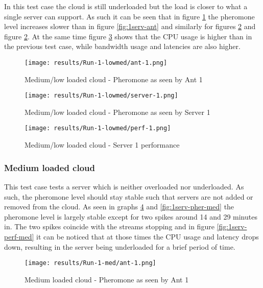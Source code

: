 In this test case the cloud is still underloaded but the load is closer to what a single server can support. As such it can be seen that in figure \ref{fig:1serv-ant-lowmed} the pheromone level increases slower than in figure \ref{fig:1serv-ant} and similarly for figures \ref{fig:1serv-pher-lowmed} and figure \ref{fig:1serv-pher-lowmed}. At the same time figure  \ref{fig:1serv-perf-lowmed} shows that the CPU usage is higher than in the previous test case, while bandwidth usage and latencies are also higher.

\begin{figure}[!ht]
	\centering
		\texttt{[image: results/Run-1-lowmed/ant-1.png]}
	\caption{Medium/low loaded cloud - Pheromone as seen by Ant 1}
	\label{fig:1serv-ant-lowmed}
\end{figure}

\begin{figure}
	\centering
		\texttt{[image: results/Run-1-lowmed/server-1.png]}
	\caption{Medium/low loaded cloud - Pheromone as seen by Server 1}
	\label{fig:1serv-pher-lowmed}
\end{figure}

\begin{figure}
	\centering
		\texttt{[image: results/Run-1-lowmed/perf-1.png]}
	\caption{Medium/low loaded cloud - Server 1 performance}
	\label{fig:1serv-perf-lowmed}
\end{figure}

\subsubsection{Medium loaded cloud}

This test case tests a server which is neither overloaded nor underloaded. As such, the pheromone level should stay stable such that servers are not added or removed from the cloud. As seen in graphs \ref{fig:1serv-ant-med} and \ref{fig:1serv-pher-med} the pheromone level is largely stable except for two spikes around 14 and 29 minutes in. The two spikes coincide with the streams stopping and in figure \ref{fig:1serv-perf-med} it can be noticed that at those times the CPU usage and latency drops down, resulting in the server being underloaded for a brief period of time.

\begin{figure}[!ht]
	\centering
		\texttt{[image: results/Run-1-med/ant-1.png]}
	\caption{Medium loaded cloud - Pheromone as seen by Ant 1}
	\label{fig:1serv-ant-med}
\end{figure}


